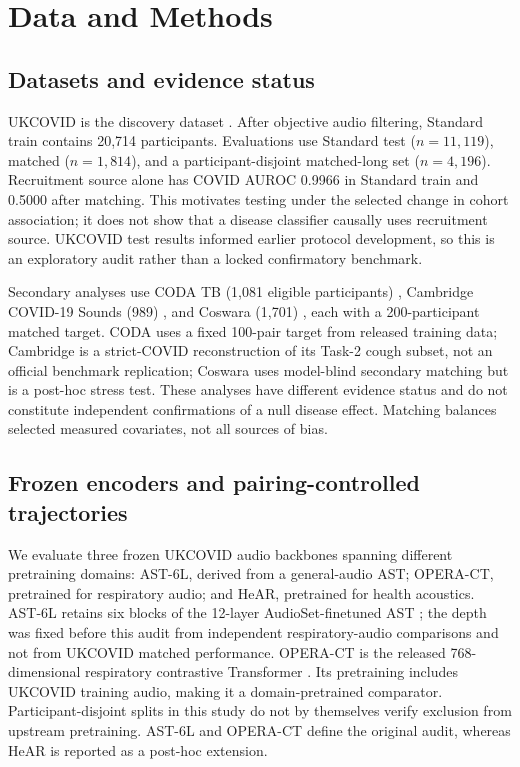 \documentclass{article}
\begin{document}
\section{Data and Methods}
\label{sec:method}

\subsection{Datasets and evidence status}

UKCOVID is the discovery dataset \cite{budd2024ukcovid}. After objective audio
filtering, Standard train contains 20,714 participants. Evaluations use
Standard test ($n=11{,}119$), matched ($n=1{,}814$), and a participant-disjoint
matched-long set ($n=4{,}196$). Recruitment source alone has COVID AUROC
0.9966 in Standard train and 0.5000 after matching. This motivates testing
under the selected change in cohort association; it does not show that a
disease classifier causally uses recruitment source. UKCOVID test results
informed earlier protocol development, so this is an exploratory audit rather
than a locked confirmatory benchmark.

Secondary analyses use CODA TB (1,081 eligible participants)
\cite{huddart2024coda}, Cambridge COVID-19 Sounds (989)
\cite{xia2021covidsounds}, and Coswara (1,701)
\cite{bhattacharya2023coswara}, each with a 200-participant matched target.
CODA uses a fixed 100-pair target from released training data; Cambridge is a
strict-COVID reconstruction of its Task-2 cough subset, not an official
benchmark replication; Coswara uses model-blind secondary matching but is a
post-hoc stress test. These analyses have different evidence status and do
not constitute independent confirmations of a null disease effect.
Matching balances selected measured covariates, not all sources of bias.

\subsection{Frozen encoders and pairing-controlled trajectories}

We evaluate three frozen UKCOVID audio backbones spanning different pretraining
domains: AST-6L, derived from a general-audio AST; OPERA-CT, pretrained for
respiratory audio; and HeAR, pretrained for health acoustics. AST-6L retains
six blocks of the 12-layer AudioSet-finetuned AST \cite{gong2021ast}; the
depth was fixed before this audit from independent respiratory-audio
comparisons and not from UKCOVID matched performance. OPERA-CT is the released
768-dimensional respiratory contrastive Transformer \cite{zhang2024opera}.
Its pretraining includes UKCOVID training audio, making it a domain-pretrained
comparator. Participant-disjoint splits in this study do not by themselves
verify exclusion from upstream pretraining. AST-6L and OPERA-CT define the
original audit, whereas HeAR is reported as a post-hoc extension.
\end{document}
